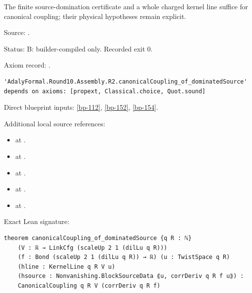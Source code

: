 \begin{theorem}[bp-155]
\label{bp-155}
\leanok
The finite source-domination certificate and a whole charged kernel line suffice for canonical coupling; their physical hypotheses remain explicit.

\par Source: \texttt{}.
\par Status: B: builder-compiled only. Recorded exit 0.
\par Axiom record: \texttt{}.
\begin{verbatim}
'AdalyFormal.Round10.Assembly.R2.canonicalCoupling_of_dominatedSource' depends on axioms: [propext, Classical.choice, Quot.sound]
\end{verbatim}
\par Direct blueprint inputs: \ref{bp-112}, \ref{bp-152}, \ref{bp-154}.
\par Additional local source references:
\begin{itemize}
\item \texttt{} at \texttt{}.
\item \texttt{} at \texttt{}.
\item \texttt{} at \texttt{}.
\item \texttt{} at \texttt{}.
\item \texttt{} at \texttt{}.
\end{itemize}
\par Exact Lean signature:
\begin{verbatim}
theorem canonicalCoupling_of_dominatedSource {q R : ℕ}
    (V : ℝ → LinkCfg (scaleUp 2 1 (dilLu q R)))
    (f : Bond (scaleUp 2 1 (dilLu q R)) → ℝ) (u : TwistSpace q R)
    (hline : KernelLine q R V u)
    (hsource : Nonvanishing.BlockSourceData ⟪u, corrDeriv q R f u⟫) :
    CanonicalCoupling q R V (corrDeriv q R f)
\end{verbatim}
\end{theorem}

